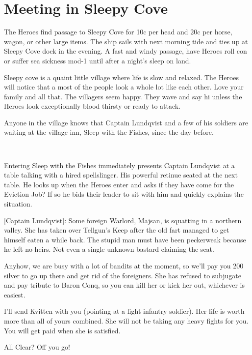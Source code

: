 \section*{Meeting in Sleepy Cove}
The Heroes find passage to Sleepy Cove for 10c per head and 20c per horse, wagon, or other large items. The ship sails with next morning tide and ties up at Sleepy Cove dock in the evening. A fast and windy passage, have Heroes roll con or suffer sea sickness mod-1 until after a night's sleep on land.

Sleepy cove is a quaint little village where life is slow and relaxed. The Heroes will notice that a most of the people look a whole lot like each other. Love your family and all that. The villagers seem happy. They wave and say hi unless the Heroes look exceptionally blood thirsty or ready to attack.

Anyone in the village knows that Captain Lundqvist and a few of his soldiers are waiting at the village inn, Sleep with the Fishes, since the day before.

\

Entering Sleep with the Fishes immediately presents Captain Lundqvist at a table talking with a hired spellslinger. His powerful retinue seated at the next table. He looks up when the Heroes enter and asks if they have come for the Eviction Job? If so he bids their leader to sit with him and quickly explains the situation.

\begin{readoutloud}

[Captain Lundqvist]: Some foreign Warlord, Majsan, is squatting in a northern valley. She has taken over Tellgun's Keep after the old fart managed to get himself eaten a while back. The stupid man must have been peckerweak because he left no heirs. Not even a single unknown bastard claiming the seat.

Anyhow, we are busy with a lot of bandits at the moment, so we'll pay you 200 silver to go up there and get rid of the foreigners. She has refused to subjugate and pay tribute to Baron Conq, so you can kill her or kick her out, whichever is easiest.

I'll send Kvitten with you (pointing at a light infantry soldier). Her life is worth more than all of yours combined. She will not be taking any heavy fights for you.
You will get paid when she is satisfied.

All Clear? Off you go!

\end{readoutloud}

